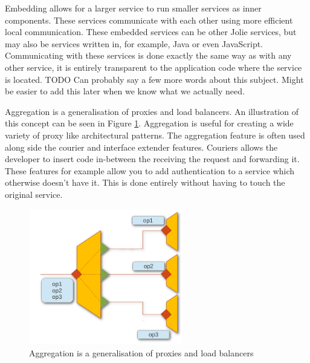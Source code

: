 Embedding allows for a larger service to run smaller services as inner
components. These services communicate with each other using more efficient
local communication. These embedded services can be other Jolie services, but
may also be services written in, for example, Java or even JavaScript.
Communicating with these services is done exactly the same way as with any
other service, it is entirely transparent to the application code where the
service is located. TODO Can probably say a few more words about this subject.
Might be easier to add this later when we know what we actually need.

Aggregation is a generalisation of proxies and load balancers. An illustration
of this concept can be seen in Figure \ref{fig:aggregation}. Aggregation is
useful for creating a wide variety of proxy like architectural patterns. The
aggregation feature is often used along side the courier and interface extender
features. Couriers allows the developer to insert code in-between the receiving
the request and forwarding it. These features for example allow you to add
authentication to a service which otherwise doesn't have it. This is done
entirely without having to touch the original service.

\begin{figure}[H]
    \centering
    \includegraphics[width=0.6\textwidth]{pictures/aggregation.png}
    \caption{Aggregation is a generalisation of proxies and load balancers}
    \label{fig:aggregation}
\end{figure}


